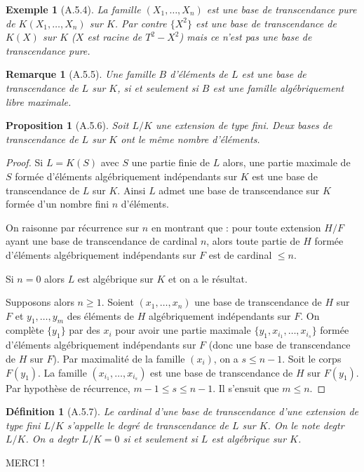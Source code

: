 \documentclass[12pts,a4paper]{report}
\newtheorem{definition}{Définition}
\newtheorem{exemple}{Exemple}
\newtheorem{proposition}{Proposition}
\newtheorem{remarque}{Remarque}
\begin{document}
\begin{exemple}[A.5.4]
La famille \( (X_1, \ldots, X_n) \) est une base de transcendance pure de \( K(X_1, \ldots, X_n) \) sur \( K \). Par contre \( \{X^2\} \) est une base de transcendance de \( K(X) \) sur \( K \) (\( X \) est racine de \( T^2 - X^2 \)) mais ce n'est pas une base de transcendance pure.
\end{exemple}

\begin{remarque}[A.5.5]
Une famille \( B \) d'éléments de \( L \) est une base de transcendance de \( L \) sur \( K \), si et seulement si \( B \) est une famille algébriquement libre maximale.
\end{remarque}

\begin{proposition}[A.5.6]
Soit \( L/K \) une extension de type fini. Deux bases de transcendance de \( L \) sur \( K \) ont le même nombre d'éléments.
\end{proposition}

\begin{proof}
Si \( L = K(S) \) avec \( S \) une partie finie de \( L \) alors, une partie maximale de \( S \) formée d'éléments algébriquement indépendants sur \( K \) est une base de transcendance de \( L \) sur \( K \). Ainsi \( L \) admet une base de transcendance sur \( K \) formée d'un nombre fini \( n \) d'éléments.

On raisonne par récurrence sur \( n \) en montrant que : pour toute extension \( H/F \) ayant une base de transcendance de cardinal \( n \), alors toute partie de \( H \) formée d'éléments algébriquement indépendants sur \( F \) est de cardinal \( \leq n \).

Si \( n = 0 \) alors \( L \) est algébrique sur \( K \) et on a le résultat.

Supposons alors \( n \geq 1 \). Soient \( (x_1, \ldots, x_n) \) une base de transcendance de \( H \) sur \( F \) et \( y_1, \ldots, y_m \) des éléments de \( H \) algébriquement indépendants sur \( F \). On complète \( \{y_1\} \) par des \( x_i \) pour avoir une partie maximale \( \{y_1, x_{i_1}, \ldots, x_{i_s}\} \) formée d'éléments algébriquement indépendants sur \( F \) (donc une base de transcendance de \( H \) sur \( F \)). Par maximalité de la famille \( (x_i) \), on a \( s \leq n - 1 \). Soit le corps \( F(y_1) \). La famille \( (x_{i_1}, \ldots, x_{i_s}) \) est une base de transcendance de \( H \) sur \( F(y_1) \). Par hypothèse de récurrence, \( m - 1 \leq s \leq n - 1 \). Il s'ensuit que \( m \leq n \). \qedhere
\end{proof}

\begin{definition}[A.5.7]
Le cardinal d'une base de transcendance d'une extension de type fini \( L/K \) s'appelle le degré de transcendance de \( L \) sur \( K \). On le note degtr \( L/K \). On a degtr \( L/K = 0 \) si et seulement si \( L \) est algébrique sur \( K \).
\end{definition}
     \begin{center}
     	MERCI !
     \end{center}
\end{document}

